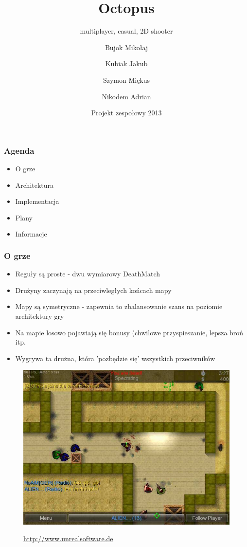 \documentclass{beamer}
\title
{Octopus}
\subtitle{multiplayer, casual, 2D shooter}
\author[]
{Bujok Mikołaj \and Kubiak Jakub \\ \and Szymon Miękus\and Nikodem Adrian}
\date[\today]
{Projekt zespołowy 2013}
\begin{document}
\frame{\titlepage}
\begin{frame}
  \frametitle{Agenda}
  \begin{itemize}
  \item O grze
  \item Architektura
  \item Implementacja
  \item Plany
  \item Informacje
  \end{itemize}
\end{frame}

\begin{frame}
  \frametitle{O grze}
  \begin{itemize}
    \item Reguły są proste - dwu wymiarowy DeathMatch
    \item Drużyny zaczynają na przeciwległych końcach mapy
    \item Mapy są symetryczne - zapewnia to zbalansowanie
          szans na poziomie architektury gry
    \item Na mapie losowo pojawiają się bonusy (chwilowe przyspieszanie, lepsza broń itp.
    \item Wygrywa ta drużna, która 'pozbędzie się' wszystkich przeciwników
  \end{itemize}
\end{frame}

\begin{frame}
\begin{figure}[ht]

\includegraphics[scale=0.4]{cs2d.jpg}
\label{cs2d}
\caption{\href{http://www.unrealsoftware.de}{http://www.unrealsoftware.de}}
\end{figure}
\end{frame}
\end{document}
